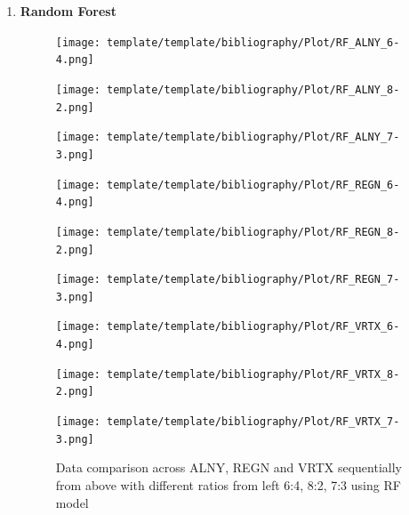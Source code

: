 \documentclass{ieeeojies}
\begin{document}
\begin{enumerate}
  \item \textbf{Random Forest} 
\begin{figure}[H]
    \centering
    \begin{minipage}{0.155\textwidth}
    \centering
    \texttt{[image: template/template/bibliography/Plot/RF\_ALNY\_6-4.png]}
    \end{minipage}
    \hfill
    \begin{minipage}{0.155\textwidth}
    \centering
    \texttt{[image: template/template/bibliography/Plot/RF\_ALNY\_8-2.png]}
    \end{minipage}
    \hfill
    \begin{minipage}{0.155\textwidth}
    \centering
    \texttt{[image: template/template/bibliography/Plot/RF\_ALNY\_7-3.png]}
    \end{minipage}
    \hfill
    \begin{minipage}{0.155\textwidth}
    \centering
    \texttt{[image: template/template/bibliography/Plot/RF\_REGN\_6-4.png]}
    \end{minipage}
    \hfill
    \begin{minipage}{0.155\textwidth}
    \centering
    \texttt{[image: template/template/bibliography/Plot/RF\_REGN\_8-2.png]}
    \end{minipage}
    \hfill
    \begin{minipage}{0.155\textwidth}
    \centering
    \texttt{[image: template/template/bibliography/Plot/RF\_REGN\_7-3.png]}
    \end{minipage}
    \hfill
    \begin{minipage}{0.155\textwidth}
    \centering
    \texttt{[image: template/template/bibliography/Plot/RF\_VRTX\_6-4.png]}
    \end{minipage}
    \hfill
    \begin{minipage}{0.155\textwidth}
    \centering
    \texttt{[image: template/template/bibliography/Plot/RF\_VRTX\_8-2.png]}
    \end{minipage}
    \hfill
    \begin{minipage}{0.155\textwidth}
    \centering
    \texttt{[image: template/template/bibliography/Plot/RF\_VRTX\_7-3.png]}
    \end{minipage}
\caption{Data comparison across ALNY, REGN and VRTX sequentially from above with different ratios from left 6:4, 8:2, 7:3 using RF model}
\label{fig:combined}
\end{figure}



\end{enumerate}
\end{document}
